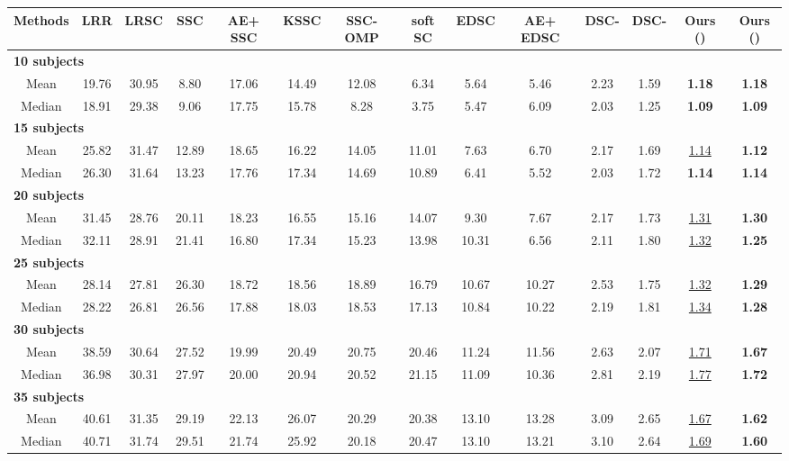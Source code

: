 \documentclass[10pt,twocolumn,letterpaper]{article}
\begin{document}
\begin{table*}[t]
\scriptsize
\centering
\begin{tabular}{c|c c c c c c c c c c c |c c}
\hline
\!Methods & \!LRR & \!LRSC & \!SSC & \!\!AE+ SSC & \!KSSC & \!SSC-OMP & \!soft SC & \!EDSC & \!AE+ EDSC & \!DSC- & \!DSC-
& {\bf Ours} () & {\bf Ours} () \\
\hline
\multicolumn{12}{l}{\textbf{10 subjects}} \\
\hline
Mean   &19.76 &30.95 & 8.80 &17.06& 14.49& 12.08   & 6.34 & 5.64 &5.46& 2.23& 1.59& \textbf{1.18} & \textbf{1.18} \\ Median &18.91 &29.38 & 9.06& 17.75& 15.78& 8.28 & 3.75 &5.47& 6.09& 2.03& 1.25& \textbf{1.09} & \textbf{1.09} \\\hline
\multicolumn{12}{l}{\textbf{15 subjects}} \\
\hline
Mean   &25.82  &31.47 & 12.89  & 18.65 &16.22 &14.05& 11.01    & 7.63 &6.70 &2.17 &1.69& \underline{1.14}& \textbf{1.12} \\Median &26.30  &31.64 & 13.23  &17.76  &17.34 &14.69& 10.89    & 6.41 &5.52 &2.03 &1.72& \textbf{1.14}& \textbf{1.14} \\\hline
\multicolumn{12}{l}{\textbf{20 subjects}}\\
\hline
Mean  &31.45 &28.76 &20.11& 18.23& 16.55& 15.16   & 14.07         &9.30 &7.67& 2.17 &1.73& \underline{1.31}&\textbf{1.30} \\Median&32.11 &28.91 &21.41& 16.80& 17.34 &15.23 & 13.98         &10.31& 6.56 &2.11 &1.80&\underline{1.32}&\textbf{1.25} \\\hline
\multicolumn{12}{l}{\textbf{25 subjects}} \\
\hline
Mean  &28.14& 27.81& 26.30 &18.72& 18.56 &18.89   &16.79      &10.67 &10.27 &2.53 &1.75& \underline{1.32}&\textbf{1.29} \\ Median&28.22& 26.81& 26.56 & 17.88& 18.03 &18.53 &17.13      &10.84& 10.22 &2.19 &1.81& \underline{1.34}&\textbf{1.28} \\\hline
\multicolumn{12}{l}{\textbf{30 subjects}} \\
\hline
Mean  &38.59 &30.64& 27.52 &19.99& 20.49& 20.75   & 20.46     &11.24& 11.56 &2.63 &2.07& \underline{1.71}&\textbf{1.67} \\ Median&36.98 &30.31& 27.97& 20.00 &20.94 &20.52 & 21.15     &11.09 &10.36 &2.81 &2.19& \underline{1.77} &\textbf{1.72} \\ \hline
\multicolumn{12}{l}{\textbf{35 subjects}}\\
\hline
Mean   &40.61&31.35& 29.19& 22.13 &26.07& 20.29   &20.38      &13.10& 13.28  & 3.09& 2.65&\underline{1.67}&\textbf{1.62} \\ Median &40.71&31.74& 29.51& 21.74& 25.92& 20.18&20.47       &13.10& 13.21& 3.10& 2.64& \underline{1.69}&\textbf{1.60} \\ \hline

\end{tabular}
\end{table*}
\end{document}
